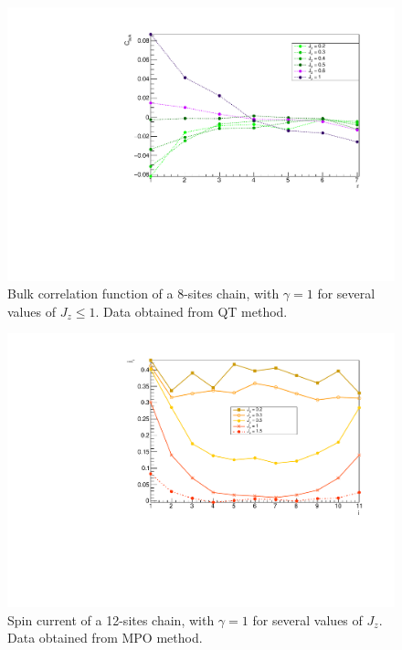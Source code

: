 \begin{figure}[H]
    \centering
    \includegraphics[scale=0.7]{Figures/8sites/8sites_CFBulkvsLowJz_QT.pdf}
    \caption{Bulk correlation function of a 8-sites chain, with $\gamma = 1$ for several values of $J_z \leq 1$. Data obtained from QT method.}
    \label{fig:8sites_CFBulkvsLowJz_QT}
\end{figure}


\begin{figure}[H]
    \centering
    \includegraphics[scale=0.7]{Figures/12sites_spinCurrVSJz.pdf}
    \caption{Spin current of a 12-sites chain, with $\gamma = 1$ for several values of $J_z$. Data obtained from MPO method.}
    \label{fig:12sites_spinCurrVSJz}
\end{figure}

